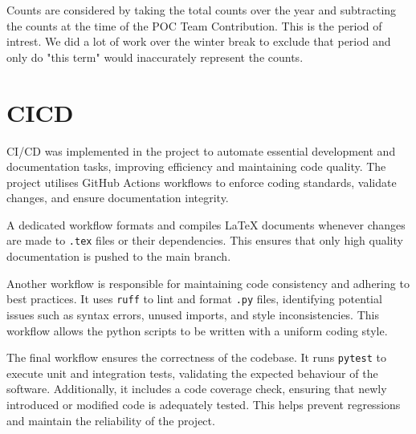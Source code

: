 \documentclass{article}
\begin{document}
Counts are considered by taking the total counts over the year and subtracting the counts at the time of the POC Team Contribution. This is the period of intrest. 
We did a lot of work over the winter break to exclude that period and only do "this term" would inaccurately represent the counts.
\section{CICD}


CI/CD was implemented in the project to automate essential
development and documentation tasks, improving efficiency and
maintaining code quality. The project utilises GitHub Actions
workflows to enforce coding standards, validate changes, and ensure
documentation integrity.

A dedicated workflow formats and compiles \LaTeX{} documents whenever
changes are made to \texttt{.tex} files or their dependencies. This ensures that
only high quality documentation is pushed to the main branch.

Another workflow is responsible for maintaining code consistency and
adhering to best practices. It uses \texttt{ruff} to lint and format
\texttt{.py} files, identifying potential issues such as syntax
errors, unused imports, and style inconsistencies. This workflow
allows the python scripts to be written with a uniform coding style.

The final workflow ensures the correctness of the codebase. It runs
\texttt{pytest} to execute unit and integration tests, validating the
expected behaviour of the software. Additionally, it includes a code
coverage check, ensuring that newly introduced or modified code is
adequately tested. This helps prevent regressions and maintain the
reliability of the project.
\end{document}
